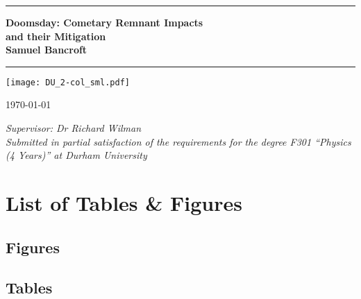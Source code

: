 \documentclass[12pt]{book}
\makeatletter
\providecommand\phantomsection{}%
\newcommand\listofillustrations{%
    \chapter*{List of Tables \& Figures}%
    \phantomsection
    \section*{Figures}%
    \phantomsection
    \@starttoc{lof}%
    \bigskip
    \section*{Tables}%
    \phantomsection
    \@starttoc{lot}}
\makeatother
\begin{document}
{\let\cleardoublepage\clearpage 

\titlepage


{
  \thispagestyle{empty}
  {\parindent0cm
   \rule{\linewidth}{.7ex}}
  \begin{flushright}

    \sffamily\bfseries\Huge
    Doomsday: Cometary Remnant Impacts\\and their Mitigation\\
    \sffamily\bfseries\large
    Samuel Bancroft
  \end{flushright}
  \rule{\linewidth}{.7ex}
  
\vspace{3ex}
\small{
\begin{center}%
  {\bfseries \vspace{-.5em}{Abstract}}%
\end{center}%
\vspace{-3ex}
\noindent {}
}

  \begin{center}
    \texttt{[image: DU\_2-col\_sml.pdf]}
  \end{center}
  \begin{center}\sffamily\LARGE{\today}\end{center}

  \thispagestyle{empty}

  \begin{center}
  \large \emph{Supervisor: Dr Richard Wilman}\\
  \vspace{5ex}
  \emph{Submitted in partial satisfaction of the requirements for the degree
F301 ``Physics (4 Years)'' at Durham University}
  \end{center}
}

\endtitlepage


  \tableofcontents
  \listofillustrations
   
  \mainmatter\setcounter{page}{1}
  \raggedbottom
  
  
  
  

  \backmatter
  
  \markboth{}{}
  
  


} %
\end{document}
